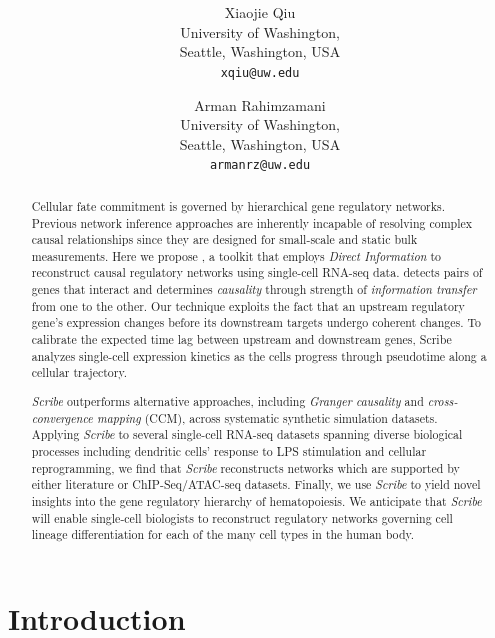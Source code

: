 \documentclass[10pt,oneside]{article}\usepackage[]{graphicx}\usepackage[]{color}
\title{\textsf{\textbf{\thetitle}}}
\author{Xiaojie Qiu\\[1em]University of Washington,\\ Seattle, Washington, USA\\
\texttt{xqiu@uw.edu} \and
Arman Rahimzamani\\[1em]University of Washington,\\ Seattle, Washington, USA\\
\texttt{armanrz@uw.edu}
}
\begin{document}






\maketitle
\begin{abstract}
Cellular fate commitment is governed by hierarchical gene regulatory networks. Previous network inference approaches are inherently incapable of resolving complex causal relationships since they are designed for small-scale and static bulk measurements. Here we propose , a toolkit that employs \emph{Direct Information} to reconstruct causal regulatory networks using single-cell RNA-seq data.  detects pairs of genes that interact and determines \emph{causality} through strength of \emph{information transfer} from one to the other. Our technique exploits the fact that an upstream regulatory gene's expression changes before its downstream targets undergo coherent changes. To calibrate the expected time lag between upstream and downstream genes, Scribe analyzes single-cell expression kinetics as the cells progress through pseudotime along a cellular trajectory.

\emph{Scribe} outperforms alternative approaches, including \emph{Granger causality} and \emph{cross-convergence mapping} (CCM), across systematic synthetic simulation datasets. Applying \emph{Scribe} to several single-cell RNA-seq datasets spanning diverse biological processes including dendritic cells' response to LPS stimulation and cellular reprogramming, we find that \emph{Scribe} reconstructs networks which are supported by either literature or ChIP-Seq/ATAC-seq datasets. Finally, we use \emph{Scribe} to yield novel insights into the gene regulatory hierarchy of hematopoiesis. We anticipate that \emph{Scribe} will enable single-cell biologists to reconstruct regulatory networks governing cell lineage differentiation for each of the many cell types in the human body. 
% 
\end{abstract}

\tableofcontents



\section{Introduction}
\end{document}
